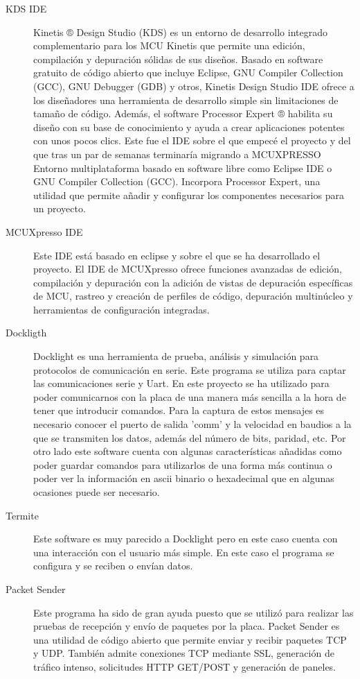 \begin{description}
\item[KDS IDE]
Kinetis ® Design Studio (KDS) es un entorno de desarrollo integrado complementario para los MCU Kinetis que permite una edición, compilación y depuración sólidas de sus diseños. Basado en software gratuito de código abierto que incluye Eclipse, GNU Compiler Collection (GCC), GNU Debugger (GDB) y otros, Kinetis Design Studio IDE ofrece a los diseñadores una herramienta de desarrollo simple sin limitaciones de tamaño de código. Además, el software Processor Expert ® habilita su diseño con su base de conocimiento y ayuda a crear aplicaciones potentes con unos pocos clics.
Este fue el IDE sobre el que empecé el proyecto y del que tras un par de semanas terminaría migrando a MCUXPRESSO 
Entorno multiplataforma basado en software libre como Eclipse IDE o GNU Compiler Collection (GCC). Incorpora Processor Expert, una utilidad que permite añadir y configurar los componentes necesarios para un proyecto.


\item[MCUXpresso IDE]
Este IDE está basado en eclipse y sobre el que se ha desarrollado el proyecto. 
El IDE de MCUXpresso ofrece funciones avanzadas de edición, compilación y depuración con la adición de vistas de depuración específicas de MCU, rastreo y creación de perfiles de código, depuración multinúcleo y herramientas de configuración integradas.

\item[Dockligth]
Docklight es una herramienta de prueba, análisis y simulación para protocolos de comunicación en serie.
Este programa se utiliza para captar las comunicaciones serie y Uart. En este proyecto se ha utilizado para poder comunicarnos con la placa de una manera más sencilla a la hora de tener que introducir comandos. Para la captura de estos mensajes es necesario conocer el puerto de salida 'comm' y la velocidad en baudios a la que se transmiten los datos, además del número de bits, paridad, etc.
Por otro lado este software cuenta con algunas características añadidas como poder guardar comandos para utilizarlos de una forma más continua o poder ver la información en ascii binario o hexadecimal que en algunas ocasiones puede ser necesario.

\item[Termite]
Este software es muy parecido a Docklight pero en este caso cuenta con una interacción con el usuario más simple. En este caso el programa se configura y se reciben o envían datos.

\item[Packet Sender]
Este programa ha sido de gran ayuda puesto que se utilizó para realizar las pruebas de recepción y envío de paquetes por la placa. 
Packet Sender es una utilidad de código abierto que permite enviar y recibir paquetes TCP y UDP. También admite conexiones TCP mediante SSL, generación de tráfico intenso, solicitudes HTTP GET/POST y generación de paneles.
\end{description}

